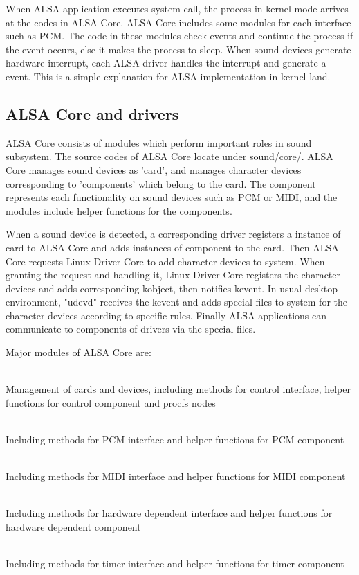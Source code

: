 \documentclass[onecolumn]{article}
\begin{document}
When ALSA application executes system-call, the process in kernel-mode arrives at the codes in ALSA Core. ALSA Core includes some modules for each interface such as PCM. The code in these modules check events and continue the process if the event occurs, else it makes the process to sleep. When sound devices generate hardware interrupt, each ALSA driver handles the interrupt and generate a event. This is a simple explanation for ALSA implementation in kernel-land.

\subsection{ALSA Core and drivers}

ALSA Core consists of modules which perform important roles in sound subsystem. The source codes of ALSA Core locate under sound/core/. ALSA Core manages sound devices as 'card', and manages character devices corresponding to 'components' which belong to the card\cite{alsa-driver}. The component represents each functionality on sound devices such as PCM or MIDI, and the modules include helper functions for the components.

When a sound device is detected, a corresponding driver registers a instance of card to ALSA Core and adds instances of component to the card. Then ALSA Core requests Linux Driver Core to add character devices to system. When granting the request and handling it, Linux Driver Core registers the character devices and adds corresponding kobject, then notifies kevent. In usual desktop environment, "udevd" receives the kevent and adds special files to system for the character devices according to specific rules. Finally ALSA applications can communicate to components of drivers via the special files.

Major modules of ALSA Core are:

\begin{description}
\small
\item[snd] \mbox{} \\
Management of cards and devices, including methods for control interface, helper functions for control component and procfs nodes
\item[snd\_pcm] \mbox{} \\
Including methods for PCM interface and helper functions for PCM component
\item[snd\_rawmidi] \mbox{} \\
Including methods for MIDI interface and helper functions for MIDI component
\item[snd\_hwdep] \mbox{} \\
Including methods for hardware dependent interface and helper functions for hardware dependent component
\item[snd\_timer] \mbox{} \\
Including methods for timer interface and helper functions for timer component
\end{description}
\end{document}
